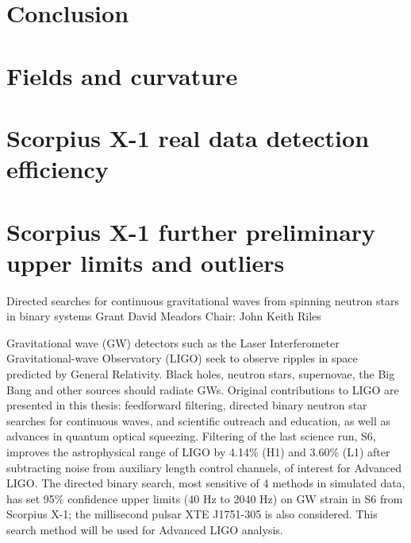 \documentclass[leqno,twoside]{report}
\theoremstyle{plain}
\theoremstyle{definition}
\theoremstyle{remark}
\numberwithin{theorem}{chapter}        %
\begin{document}
\chapter{Conclusion}
\label{conclusion}



\startappendices
\chapter{Fields and curvature}
\label{appendix}

\chapter{Scorpius X-1 real data detection efficiency}
\label{appendix2}

\chapter{Scorpius X-1 further preliminary upper limits and outliers}
\label{appendix3}





\startabstractpage
{Directed searches for continuous gravitational waves from spinning neutron stars in binary systems } {Grant David Meadors} {Chair: John Keith Riles}

Gravitational wave (GW) detectors such as the Laser Interferometer Gravitational-wave Observatory (LIGO) seek to observe ripples in space predicted by General Relativity. 
Black holes, neutron stars, supernovae, the Big Bang and other sources should radiate GWs.
Original contributions to LIGO are presented in this thesis: feedforward filtering, directed binary neutron star searches for continuous waves, and scientific outreach and education, as well as advances in quantum optical squeezing.
Filtering of the last science run, S6, improves the astrophysical range of LIGO by 4.14\% (H1) and 3.60\% (L1) after subtracting noise from auxiliary length control channels, of interest for Advanced LIGO.
The directed binary search, most sensitive of 4 methods in simulated data, has set 95\% confidence upper limits (40 Hz to 2040 Hz) on GW strain in S6 from Scorpius X-1; the millisecond pulsar XTE J1751-305 is also considered.
This search method will be used for Advanced LIGO analysis.
\end{document}
